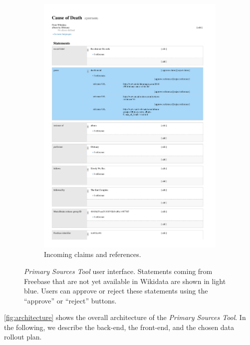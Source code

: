 \documentclass{sig-alternate-2013}
\begin{document}
\begin{figure}[!t]
\begin{subfigure}[b]{1.0\columnwidth}
        \includegraphics[width=\textwidth]{img/wikidata-cause-of-death.pdf}
        \caption{Incoming claims and references.}
        \label{fig:cause-of-death}
    \end{subfigure}
    \caption{\emph{Primary Sources Tool} user interface. Statements coming from
       Freebase that are not yet available in Wikidata are shown in light blue.
       Users can approve or reject these statements using the ``approve'' or ``reject'' buttons.}
    \label{fig:primary-sources-tool}
\end{figure}

\autoref{fig:architecture} shows the overall architecture of the \emph{Primary Sources Tool}.
In the following, we describe the back-end, the front-end, and the chosen data rollout plan.
\end{document}
